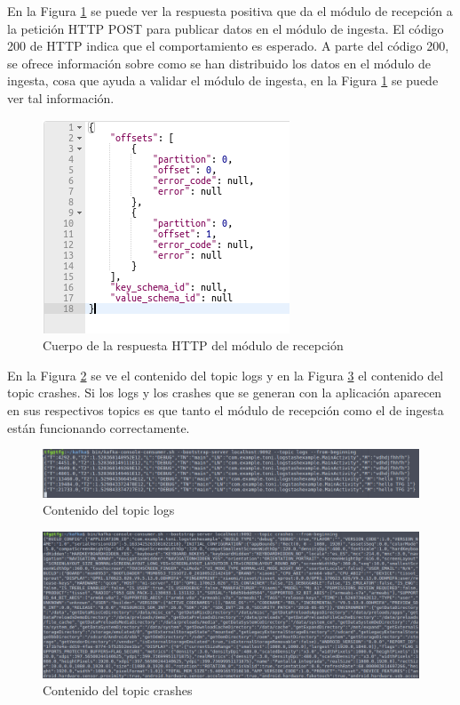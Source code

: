 

En la Figura \ref{fig:POST} se puede ver la respuesta positiva que da el módulo de recepción a la petición HTTP POST para publicar datos en el módulo de ingesta. El código 200 de HTTP indica que el comportamiento es esperado. A parte del código 200, se ofrece información sobre como se han distribuido los datos en el módulo de ingesta, cosa que ayuda a validar el módulo de ingesta, en la Figura \ref{fig:POST} se puede ver tal información.

\begin{figure}[!htb]
	\centering
	\includegraphics[scale=0.60] {kafka-rest.png}
	\caption{Cuerpo de la respuesta HTTP del módulo de recepción}
	\label{fig:POST}
\end{figure}


En la Figura \ref{fig:logs} se ve el contenido del topic logs y en la Figura \ref{fig:crashes} el contenido del topic crashes. Si los logs y los crashes que se generan con la aplicación aparecen en sus respectivos topics es que tanto el módulo de recepción como el de ingesta están funcionando correctamente.

\begin{figure}[!htb]
	\centering
	\includegraphics[scale=0.60, width=\linewidth] {kafka-logs.png}
	\caption{Contenido del topic logs}
	\label{fig:logs}
\end{figure}


\begin{figure}[!htb]
	\centering
	\includegraphics[scale=0.60, width=\linewidth] {kafka-crashes.png}
	\caption{Contenido del topic crashes}
	\label{fig:crashes}
\end{figure}


